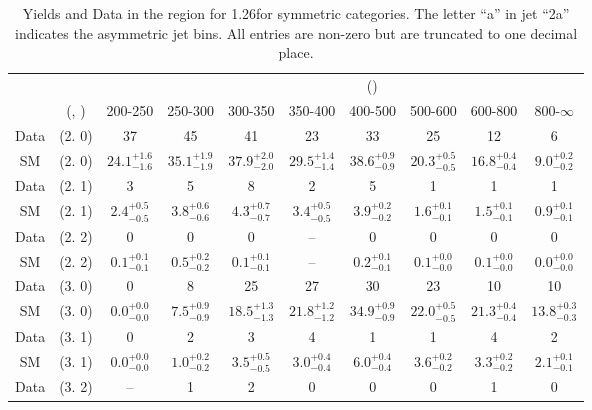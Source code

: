 \begin{table}[h!]
\tiny
\centering
\caption{Yields and Data in the \mmj region for 1.26\ifb for symmetric categories. The letter ``a'' in jet \eg ``2a''  indicates the asymmetric jet bins. All entries are non-zero but are truncated to one decimal place.\label{tab:yieldsall_comb_mumu_sym}}
\begin{tabular}
{cccccccccc}
	\hline\hline
&	&	& \multicolumn{8}{c}{\scalht (\gev)}\\ 
	&	 (\njet, \nb) & 200-250 & 250-300 & 300-350 & 350-400 & 400-500 & 500-600 & 600-800 & 800-$\infty$ \\ [0.8ex] 
\hline
	Data & (2. 0) & 37 & 45 & 41 & 23 & 33 & 25 & 12 & 6 \\[0.5ex] 
	SM & (2. 0) & $24.1^{+ 1.6 }_{- 1.6 }$ & $35.1^{+ 1.9 }_{- 1.9 }$ & $37.9^{+ 2.0 }_{- 2.0 }$ & $29.5^{+ 1.4 }_{- 1.4 }$ & $38.6^{+ 0.9 }_{- 0.9 }$ & $20.3^{+ 0.5 }_{- 0.5 }$ & $16.8^{+ 0.4 }_{- 0.4 }$ & $9.0^{+ 0.2 }_{- 0.2 }$ \\[0.5ex] 
	Data & (2. 1) & 3 & 5 & 8 & 2 & 5 & 1 & 1 & 1 \\[0.5ex] 
	SM & (2. 1) & $2.4^{+ 0.5 }_{- 0.5 }$ & $3.8^{+ 0.6 }_{- 0.6 }$ & $4.3^{+ 0.7 }_{- 0.7 }$ & $3.4^{+ 0.5 }_{- 0.5 }$ & $3.9^{+ 0.2 }_{- 0.2 }$ & $1.6^{+ 0.1 }_{- 0.1 }$ & $1.5^{+ 0.1 }_{- 0.1 }$ & $0.9^{+ 0.1 }_{- 0.1 }$ \\[0.5ex] 
	Data & (2. 2) & 0 & 0 & 0 & -- & 0 & 0 & 0 & 0 \\[0.5ex] 
	SM & (2. 2) & $0.1^{+ 0.1 }_{- 0.1 }$ & $0.5^{+ 0.2 }_{- 0.2 }$ & $0.1^{+ 0.1 }_{- 0.1 }$ & -- & $0.2^{+ 0.1 }_{- 0.1 }$ & $0.1^{+ 0.0 }_{- 0.0 }$ & $0.1^{+ 0.0 }_{- 0.0 }$ & $0.0^{+ 0.0 }_{- 0.0 }$ \\[0.5ex] 
	Data & (3. 0) & 0 & 8 & 25 & 27 & 30 & 23 & 10 & 10 \\[0.5ex] 
	SM & (3. 0) & $0.0^{+ 0.0 }_{- 0.0 }$ & $7.5^{+ 0.9 }_{- 0.9 }$ & $18.5^{+ 1.3 }_{- 1.3 }$ & $21.8^{+ 1.2 }_{- 1.2 }$ & $34.9^{+ 0.9 }_{- 0.9 }$ & $22.0^{+ 0.5 }_{- 0.5 }$ & $21.3^{+ 0.4 }_{- 0.4 }$ & $13.8^{+ 0.3 }_{- 0.3 }$ \\[0.5ex] 
	Data & (3. 1) & 0 & 2 & 3 & 4 & 1 & 1 & 4 & 2 \\[0.5ex] 
	SM & (3. 1) & $0.0^{+ 0.0 }_{- 0.0 }$ & $1.0^{+ 0.2 }_{- 0.2 }$ & $3.5^{+ 0.5 }_{- 0.5 }$ & $3.0^{+ 0.4 }_{- 0.4 }$ & $6.0^{+ 0.4 }_{- 0.4 }$ & $3.6^{+ 0.2 }_{- 0.2 }$ & $3.3^{+ 0.2 }_{- 0.2 }$ & $2.1^{+ 0.1 }_{- 0.1 }$ \\[0.5ex] 
	Data & (3. 2) & -- & 1 & 2 & 0 & 0 & 0 & 1 & 0 \\[0.5ex] 

\end{tabular}
\end{table}
